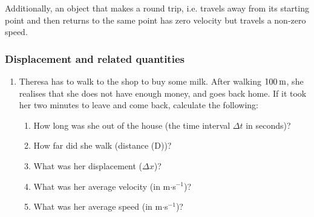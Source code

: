     \par
  
        
        \label{m38791*id66611}Additionally, an object that makes a round trip, i.e. travels away from its starting point and then returns to the same point has zero velocity but travels a non-zero speed.\par 
\label{m38791*secfhsst!!!underscore!!!id1252}
            \subsubsection{  Displacement and related quantities }
            \nopagebreak
            
        \label{m38791*id66624}\begin{enumerate}[noitemsep, label=\textbf{\arabic*}. ] 
            \label{m38791*uid38}\item Theresa has to walk to the shop to buy some milk. After walking \begin{math}100\phantom{\rule{2pt}{0ex}}\mathrm{m}\end{math}, she realises that she does not have enough money, and goes back home. If it took her two minutes to leave and come back, calculate the following:
\label{m38791*id66641}\begin{enumerate}[noitemsep, label=\textbf{\alph*}. ] 
            \label{m38791*uid39}\item How long was she out of the house (the time interval \begin{math}\Delta t\end{math} in seconds)?
\label{m38791*uid40}\item How far did she walk (distance (D))?
\label{m38791*uid41}\item What was her displacement (\begin{math}\Delta x\end{math})?
\label{m38791*uid42}\item What was her average velocity (in m\begin{math}\ensuremath{\cdot}\end{math}s\begin{math}{}^{-1}\end{math})?
\label{m38791*uid43}\item What was her average speed (in m\begin{math}\ensuremath{\cdot}\end{math}s\begin{math}{}^{-1}\end{math})?
\end{enumerate}
        

\end{enumerate}
